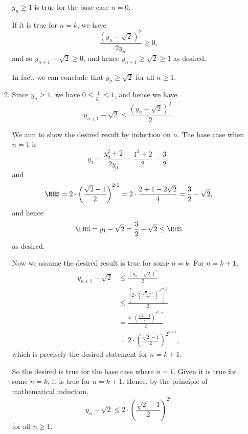\begin{enumerate}
\begin{enumerate}
                    \(y_n \geq 1\) is true for the base case \(n = 0\).

                    If it is true for \(n = k\),  we have
                    \[
                        \frac{\left(y_n - \sqrt{2}\right)^2}{2 y_n} \geq 0,                    \]
                    and so \(y_{n + 1} - \sqrt{2} \geq 0\), and hence \(y_{n + 1} \geq \sqrt{2} \geq 1\) as desired.

                    In fact, we can conclude that \(y_n \geq \sqrt{2}\) for all \(n \geq 1\).

              \item Since \(y_n \geq 1\), we have \(0 \leq \frac{1}{y_n} \leq 1\), and hence we have
                    \[
                        y_{n + 1} - \sqrt{2} \leq \frac{\left(y_n - \sqrt{2}\right)^2}{2}.
                    \]

                    We aim to show the desired result by induction on \(n\). The base case when \(n = 1\) is
                    \[
                        y_1 = \frac{y_0^2 + 2}{2 y_0} = \frac{1^2 + 2}{2} = \frac{3}{2},
                    \]
                    and
                    \[
                        \RHS = 2 \cdot \left(\frac{\sqrt{2} - 1}{2}\right)^{2 \cdot 1} = 2 \cdot \frac{2 + 1 - 2 \sqrt{2}}{4} = \frac{3}{2} - \sqrt{2},
                    \]
                    and hence
                    \[
                        \LHS = y_1 - \sqrt{2} = \frac{3}{2} - \sqrt{2} \leq \RHS
                    \]
                    as desired.

                    Now we assume the desired result is true for some \(n = k\). For \(n = k + 1\),
                    \begin{align*}
                        y_{k + 1} - \sqrt{2} & \leq \frac{\left(y_k - \sqrt{2}\right)^2}{2}                                    \\
                                             & \leq \frac{\left[2 \cdot \left(\frac{\sqrt{2} - 1}{2}\right)^{2^k}\right]^2}{2} \\
                                             & = \frac{4 \cdot \left(\frac{\sqrt{2} - 1}{2}\right)^{2^k \cdot 2}}{2}           \\
                                             & = 2 \cdot \left(\frac{\sqrt{2} - 1}{2}\right)^{2^{k + 1}},
                    \end{align*}
                    which is precisely the desired statement for \(n = k + 1\).

                    So the desired is true for the base case where \(n = 1\). Given it is true for some \(n = k\), it is true for \(n = k + 1\). Hence, by the principle of mathematical induction,
                    \[
                        y_n - \sqrt{2} \leq 2 \cdot \left(\frac{\sqrt{2} - 1}{2}\right)^{2^n}
                    \]
                    for all \(n \geq 1\).


\end{enumerate}
\end{enumerate}
